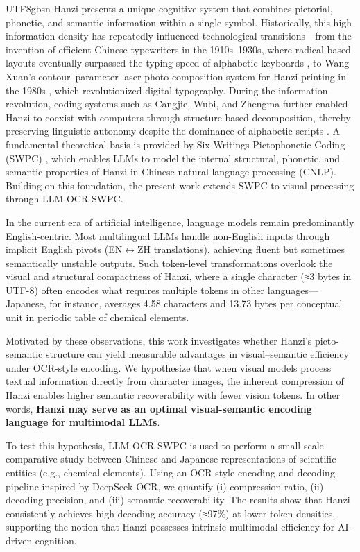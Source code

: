\documentclass[conference]{IEEEtran}
\begin{document}
\begin{CJK*}{UTF8}{gbsn}
Hanzi presents a unique cognitive system that combines pictorial, phonetic, and semantic information within a single symbol. Historically, this high information density has repeatedly influenced technological transitions—from the invention of efficient Chinese typewriters in the 1910s–1930s, where radical-based layouts eventually surpassed the typing speed of alphabetic keyboards \cite{mullaney2017chinese,weigang2022typewriter}, to Wang Xuan’s contour–parameter laser photo-composition system for Hanzi printing in the 1980s \cite{wangxuan1997}, which revolutionized digital typography. During the information revolution, coding systems such as Cangjie, Wubi, and Zhengma further enabled Hanzi to coexist with computers through structure-based decomposition, thereby preserving linguistic autonomy despite the dominance of alphabetic scripts \cite{weigang2025threshold}.  A fundamental theoretical basis is provided by Six-Writings Pictophonetic Coding (SWPC) \cite{weigang2024six}, which enables LLMs to model the internal structural, phonetic, and semantic properties of Hanzi in Chinese natural language processing (CNLP). Building on this foundation, the present work extends SWPC to visual processing through LLM-OCR-SWPC.

In the current era of artificial intelligence, language models remain predominantly English-centric. Most multilingual LLMs handle non-English inputs through implicit English pivots (EN$\leftrightarrow$ZH translations), achieving fluent but sometimes semantically unstable outputs. Such token-level transformations overlook the visual and structural compactness of Hanzi, where a single character (≈3 bytes in UTF-8) often encodes what requires multiple tokens in other languages—Japanese, for instance, averages 4.58 characters and 13.73 bytes per conceptual unit in periodic table of chemical elements.

Motivated by these observations, this work investigates whether Hanzi’s picto-semantic structure can yield measurable advantages in visual–semantic efficiency under OCR-style encoding. We hypothesize that when visual models process textual information directly from character images, the inherent compression of Hanzi enables higher semantic recoverability with fewer vision tokens. In other words, \textbf{Hanzi may serve as an optimal visual-semantic encoding language for multimodal LLMs}.

To test this hypothesis, LLM-OCR-SWPC is used to perform a small-scale comparative study between Chinese and Japanese representations of scientific entities (e.g., chemical elements). Using an OCR-style encoding and decoding pipeline inspired by DeepSeek-OCR, we quantify (i) compression ratio, (ii) decoding precision, and (iii) semantic recoverability. The results show that Hanzi consistently achieves high decoding accuracy (≈97\%) at lower token densities, supporting the notion that Hanzi possesses intrinsic multimodal efficiency for AI-driven cognition.


\end{CJK*}
\end{document}
